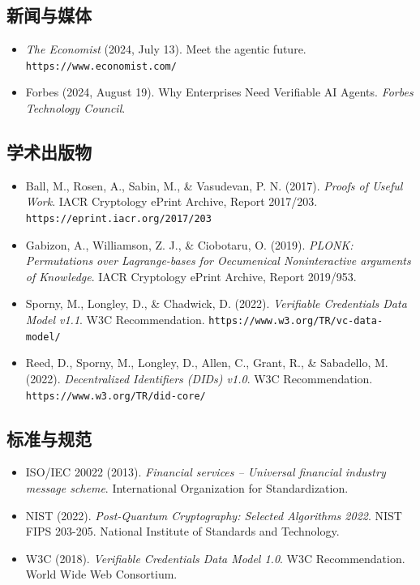\documentclass[11pt]{article}
\begin{document}
\subsection*{新闻与媒体}

\begin{itemize}[leftmargin=*, label={}]
  \item \textit{The Economist} (2024, July 13). Meet the agentic future. \texttt{https://www.economist.com/}

  \item Forbes (2024, August 19). Why Enterprises Need Verifiable AI Agents. \textit{Forbes Technology Council}.
\end{itemize}

\subsection*{学术出版物}

\begin{itemize}[leftmargin=*, label={}]
  \item Ball, M., Rosen, A., Sabin, M., \& Vasudevan, P. N. (2017). \textit{Proofs of Useful Work}. IACR Cryptology ePrint Archive, Report 2017/203. \texttt{https://eprint.iacr.org/2017/203}

  \item Gabizon, A., Williamson, Z. J., \& Ciobotaru, O. (2019). \textit{PLONK: Permutations over Lagrange-bases for Oecumenical Noninteractive arguments of Knowledge}. IACR Cryptology ePrint Archive, Report 2019/953.

  \item Sporny, M., Longley, D., \& Chadwick, D. (2022). \textit{Verifiable Credentials Data Model v1.1}. W3C Recommendation. \texttt{https://www.w3.org/TR/vc-data-model/}

  \item Reed, D., Sporny, M., Longley, D., Allen, C., Grant, R., \& Sabadello, M. (2022). \textit{Decentralized Identifiers (DIDs) v1.0}. W3C Recommendation. \texttt{https://www.w3.org/TR/did-core/}
\end{itemize}

\subsection*{标准与规范}

\begin{itemize}[leftmargin=*, label={}]
  \item ISO/IEC 20022 (2013). \textit{Financial services -- Universal financial industry message scheme}. International Organization for Standardization.

  \item NIST (2022). \textit{Post-Quantum Cryptography: Selected Algorithms 2022}. NIST FIPS 203-205. National Institute of Standards and Technology.

  \item W3C (2018). \textit{Verifiable Credentials Data Model 1.0}. W3C Recommendation. World Wide Web Consortium.
\end{itemize}
\end{document}
